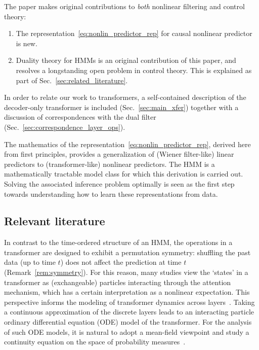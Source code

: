 \documentclass[twoside,11pt]{article}
\def\Sec#1{Sec.~\ref{#1}}
\def\Sec#1{Sec.~\ref{#1}}
\def\Sec#1{Sec~\ref{#1}}
\def\Sec#1{Sec.~\ref{#1}}
\def\Sec#1{Sec.~\ref{#1}}
\begin{document}
The paper makes original contributions to {\em both} nonlinear filtering and control theory:
\begin{enumerate}
  \item The representation~\eqref{eq:nonlin_predictor_rep} for causal nonlinear predictor is new.
  \item Duality theory for HMMs is an original contribution of this paper, and resolves a longstanding open problem in control theory.  
  This is explained as part of \Sec{sec:related_literature}. 
\end{enumerate}
In order to relate our work to transformers, a self-contained
description of the decoder-only transformer is included
(\Sec{sec:main_xfer}) together with a discussion of correspondences
with the dual filter (\Sec{sec:correspondence_layer_ops}). 

\begin{remark}
  \label{rem:inference_learning}
  The mathematics of the representation~\eqref{eq:nonlin_predictor_rep}, derived here from
  first principles, provides a generalization of (Wiener filter-like) linear predictors to (transformer-like) nonlinear predictors. 
  The HMM is a mathematically tractable model class for which this derivation
  is carried out. 
  Solving the associated inference problem optimally is seen as the first step towards understanding how to learn these representations from data.
\end{remark}

\subsection{Relevant literature}

In contrast to the time-ordered structure of an HMM, the operations in a transformer are designed to exhibit a permutation symmetry: shuffling the past data (up to time $t$) does not affect the prediction at time $t$ (Remark~\ref{rem:symmetry}).
For this reason, many studies view the `states' in a transformer as (exchangeable) particles interacting through the attention mechanism, which has a certain interpretation as a nonlinear expectation.
This perspective informs the modeling of transformer dynamics across layers~\citep{yun2019transformers,vuckovic2020mathematical,sander2022sinkformers}.
Taking a continuous approximation of the discrete layers leads to an interacting particle ordinary differential equation (ODE) model of the transformer.
For the analysis of such ODE models, it is natural to adopt a mean-field viewpoint and study a continuity equation on the space of probability measures~\citep{geshkovski2023mathematical,geshkovski2024measure,abella2024asymptotic,adu2024approximate,castin2025unified}.
\end{document}
